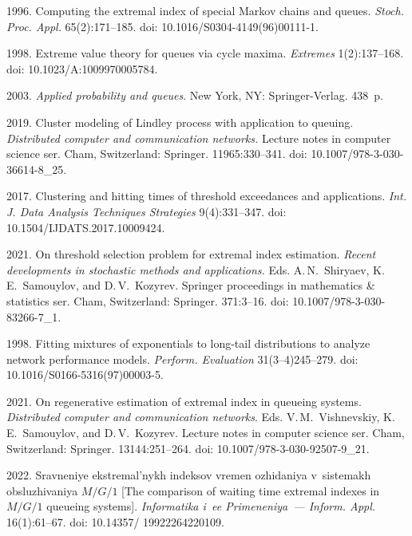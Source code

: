 \begin{multicols}{2}
{{\begin{thebibliography}{99}
 1996. Computing the extremal index of special
Markov chains and queues. \textit{Stoch. Proc. Appl.} 65(2):171--185. doi: 10.1016/S0304-4149(96)00111-1.



 1998. Extreme value theory for queues via cycle maxima. \textit{Extremes} 1(2):137--168. doi: 10.1023/A:1009970005784.

 2003. \textit{Applied probability and queues}. New York, NY: Springer-Verlag. 438~p. 

 2019.  
Cluster modeling of Lindley process with application to queuing. 
\textit{Distributed computer and communication networks.}  Lecture notes in computer science ser. 
Cham, Switzerland: Springer. 11965:330--341. doi:  10.1007/978-3-030-36614-8\_25.

 2017.  Clustering and hitting times of threshold exceedances and applications.
\textit{Int. J. Data Analysis Techniques Strategies} 9(4):331--347.
doi: 10.1504/\linebreak IJDATS.2017.10009424.


 2021. On threshold selection problem for extremal index estimation. 
\textit{Recent developments in stochastic methods and applications.} Eds. A.\,N.~Shiryaev, K.\,E.~Samouylov, and D.\,V.~Kozyrev. 
Springer proceedings in mathematics \& statistics ser.  Cham, Switzerland: Springer. 371:3--16. doi: 10.1007/978-3-030-83266-7\_1. 

 1998. Fitting mixtures of 
exponentials to long-tail distributions
to analyze network performance models. 
\textit{Perform. Evaluation} 31(3--4)245--279. doi: 10.1016/S0166-5316(97)00003-5.

 2021. On regenerative estimation of extremal index in queueing systems. \textit{Distributed computer and communication networks}. Eds. V.\,M.~Vishnevskiy,
K.\,E.~Samouylov, and D.\,V.~Kozyrev. Lecture notes in computer science ser. Cham, Switzerland: Springer. 13144:251--264. doi: 10.1007/978-3-030-92507-9\_21.

 2022.
Srav\-ne\-niye ekst\-re\-mal'\-nykh in\-dek\-sov vre\-men ozhi\-da\-niya v~sis\-te\-makh ob\-slu\-zhi\-va\-niya ${M/G/1}$
[The comparison of waiting time extremal indexes in $M/G/1$ queueing systems]. \textit{Informatika i~ee Primeneniya~--- Inform. Appl.}
16(1):61--67. doi: 10.14357/ 19922264220109.


\end{thebibliography}}}
\end{multicols}
